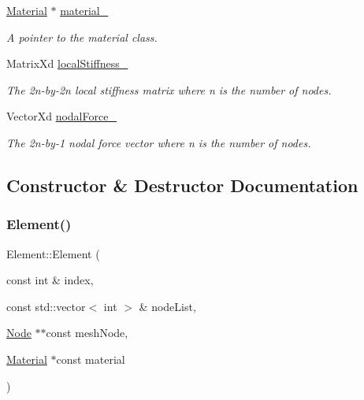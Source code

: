 \begin{DoxyCompactItemize}
\mbox{\hyperlink{class_material}{Material}} $\ast$ \mbox{\hyperlink{class_element_a049b5df45df8a2caec4f51195e7ae7b4}{material\+\_\+}}
\begin{DoxyCompactList}\small\item\em A pointer to the material class. \end{DoxyCompactList}\item 
\mbox{\label{class_element_aa784e074cb93a9731f279c91f68e6beb}} 
Matrix\+Xd \mbox{\hyperlink{class_element_aa784e074cb93a9731f279c91f68e6beb}{local\+Stiffness\+\_\+}}
\begin{DoxyCompactList}\small\item\em The 2n-\/by-\/2n local stiffness matrix where n is the number of nodes. \end{DoxyCompactList}\item 
\mbox{\label{class_element_a98da964a6e07b9deb00b170b6d9d954d}} 
Vector\+Xd \mbox{\hyperlink{class_element_a98da964a6e07b9deb00b170b6d9d954d}{nodal\+Force\+\_\+}}
\begin{DoxyCompactList}\small\item\em The 2n-\/by-\/1 nodal force vector where n is the number of nodes. \end{DoxyCompactList}\end{DoxyCompactItemize}


\subsection{Constructor \& Destructor Documentation}
\mbox{\label{class_element_aed93d541257fa2ddd3cd2202fec48bb4}} 
\subsubsection{\texorpdfstring{Element()}{Element()}}
{\footnotesize\ttfamily Element\+::\+Element (\begin{DoxyParamCaption}\item[{const int \&}]{index,  }\item[{const std\+::vector$<$ int $>$ \&}]{node\+List,  }\item[{\mbox{\hyperlink{class_node}{Node}} $\ast$$\ast$const}]{mesh\+Node,  }\item[{\mbox{\hyperlink{class_material}{Material}} $\ast$const}]{material }\end{DoxyParamCaption})}



